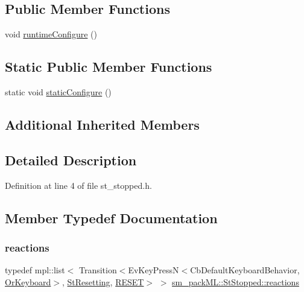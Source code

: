 \subsection*{Public Member Functions}
\begin{DoxyCompactItemize}
\item 
void \hyperlink{structsm__packML_1_1StStopped_a59f9f875b5f24cf0ef2f607b230582eb}{runtime\+Configure} ()
\end{DoxyCompactItemize}
\subsection*{Static Public Member Functions}
\begin{DoxyCompactItemize}
\item 
static void \hyperlink{structsm__packML_1_1StStopped_a8dd4d55800d1eaae7a27375b46f2b508}{static\+Configure} ()
\end{DoxyCompactItemize}
\subsection*{Additional Inherited Members}


\subsection{Detailed Description}


Definition at line 4 of file st\+\_\+stopped.\+h.



\subsection{Member Typedef Documentation}
\mbox{\label{structsm__packML_1_1StStopped_aabf80c9d33d70267864a8f17c2813aa7}} 
\subsubsection{\texorpdfstring{reactions}{reactions}}
{\footnotesize\ttfamily typedef mpl\+::list$<$ Transition$<$Ev\+Key\+PressN$<$Cb\+Default\+Keyboard\+Behavior, \hyperlink{classsm__packML_1_1OrKeyboard}{Or\+Keyboard}$>$, \hyperlink{structsm__packML_1_1StResetting}{St\+Resetting}, \hyperlink{structsm__packML_1_1StStopped_1_1RESET}{R\+E\+S\+ET}$>$ $>$ \hyperlink{structsm__packML_1_1StStopped_aabf80c9d33d70267864a8f17c2813aa7}{sm\+\_\+pack\+M\+L\+::\+St\+Stopped\+::reactions}}



